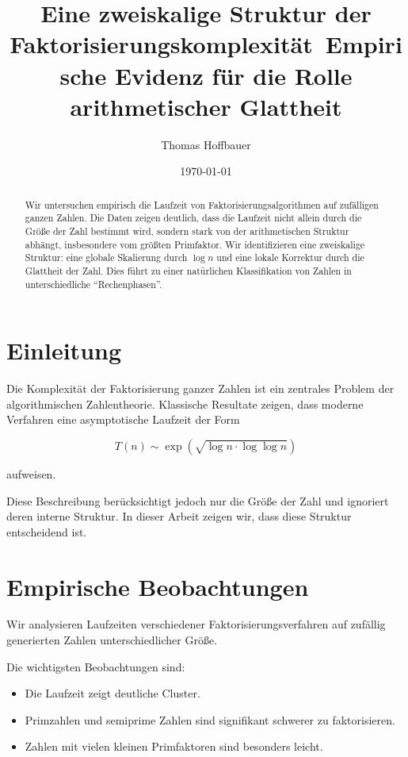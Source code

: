 \documentclass[11pt,a4paper]{article}
\title{Eine zweiskalige Struktur der Faktorisierungskomplexität\
	\large Empirische Evidenz für die Rolle arithmetischer Glattheit}
\author{Thomas Hoffbauer}
\date{\today}
\begin{document}
	
	\maketitle
	
	\begin{abstract}
		Wir untersuchen empirisch die Laufzeit von Faktorisierungsalgorithmen auf zufälligen ganzen Zahlen.
		Die Daten zeigen deutlich, dass die Laufzeit nicht allein durch die Größe der Zahl bestimmt wird,
		sondern stark von der arithmetischen Struktur abhängt, insbesondere vom größten Primfaktor.
		Wir identifizieren eine zweiskalige Struktur: eine globale Skalierung durch $\log n$ und eine lokale Korrektur durch die Glattheit der Zahl.
		Dies führt zu einer natürlichen Klassifikation von Zahlen in unterschiedliche ``Rechenphasen''.
	\end{abstract}
	
	\section{Einleitung}
	
	Die Komplexität der Faktorisierung ganzer Zahlen ist ein zentrales Problem der algorithmischen Zahlentheorie.
	Klassische Resultate zeigen, dass moderne Verfahren eine asymptotische Laufzeit der Form
	
	\begin{equation}
		T(n) \sim \exp\left( \sqrt{\log n \cdot \log \log n} \right)
	\end{equation}
	
	aufweisen.
	
	Diese Beschreibung berücksichtigt jedoch nur die Größe der Zahl und ignoriert deren interne Struktur.
	In dieser Arbeit zeigen wir, dass diese Struktur entscheidend ist.
	
	\section{Empirische Beobachtungen}
	
	Wir analysieren Laufzeiten verschiedener Faktorisierungsverfahren auf zufällig generierten Zahlen unterschiedlicher Größe.
	
	Die wichtigsten Beobachtungen sind:
	
	\begin{itemize}
		\item Die Laufzeit zeigt deutliche Cluster.
		\item Primzahlen und semiprime Zahlen sind signifikant schwerer zu faktorisieren.
		\item Zahlen mit vielen kleinen Primfaktoren sind besonders leicht.
	\end{itemize}
	
\end{document}

